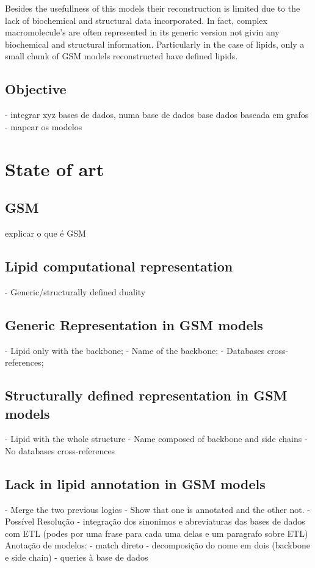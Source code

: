 \documentclass{llncs}
\begin{document}
Besides the usefullness of this models their reconstruction is limited due to the lack of biochemical and structural data incorporated.
In fact, complex macromolecule's are often represented in its generic version not givin any biochemical and structural information.
Particularly in the case of lipids, only a small chunk of GSM models reconstructed have defined lipids. 






\subsection{Objective}
- integrar xyz bases de dados, numa base de dados base dados baseada
em grafos
- mapear os modelos 
\section{State of art}
\subsection{GSM}
explicar o que é GSM

\subsection{Lipid computational representation}

- Generic/structurally defined duality

\subsection{Generic Representation in GSM models}

- Lipid only with the backbone; 
- Name of the backbone;
- Databases cross-references;

\subsection{Structurally defined representation in GSM models}

- Lipid with the whole structure
- Name composed of backbone and side chains
- No databases cross-references

\subsection{Lack in lipid annotation in GSM models}

- Merge the two previous logics
- Show that one is annotated and the other not.
- Possível Resolução
    - integração dos sinonimos e abreviaturas das bases de dados com ETL (podes por uma frase para cada uma delas e um paragrafo sobre ETL)
    Anotação de modelos:
        - match direto
        - decomposição do nome em dois (backbone e side chain) - queries à base de dados
\end{document}
